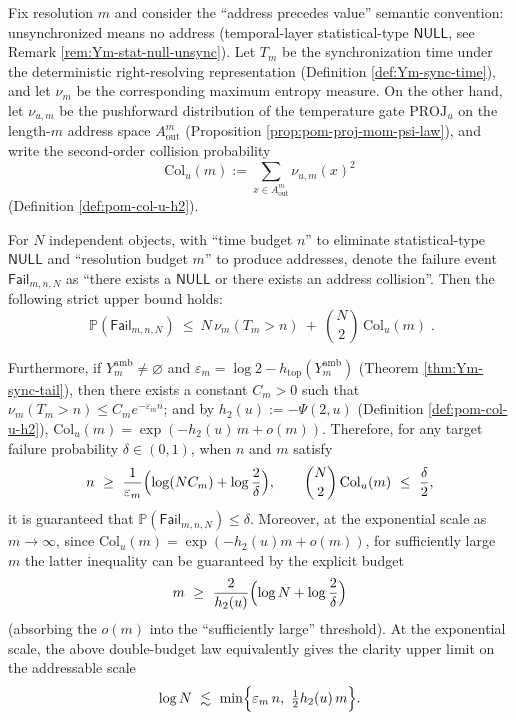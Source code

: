 \begin{theorem}\label{thm:spg-double-budget-address-capacity}
Fix resolution \(m\) and consider the ``address precedes value'' semantic convention: unsynchronized means no address (temporal-layer statistical-type \(\mathsf{NULL}\), see Remark \ref{rem:Ym-stat-null-unsync}).
Let \(T_m\) be the synchronization time under the deterministic right-resolving representation (Definition \ref{def:Ym-sync-time}), and let \(\nu_m\) be the corresponding maximum entropy measure.
On the other hand, let \(\nu_{u,m}\) be the pushforward distribution of the temperature gate \(\mathrm{PROJ}_u\) on the length-\(m\) address space \(A_{\mathrm{out}}^m\) (Proposition \ref{prop:pom-proj-mom-psi-law}), and write the second-order collision probability
\[
\mathrm{Col}_u(m):=\sum_{x\in A_{\mathrm{out}}^m}\nu_{u,m}(x)^2
\]
(Definition \ref{def:pom-col-u-h2}).
\par
For \(N\) independent objects, with ``time budget \(n\)'' to eliminate statistical-type \(\mathsf{NULL}\) and ``resolution budget \(m\)'' to produce addresses, denote the failure event \(\mathsf{Fail}_{m,n,N}\) as ``there exists a \(\mathsf{NULL}\) or there exists an address collision''.
Then the following strict upper bound holds:
\begin{equation}\label{eq:spg-double-budget-fail-bound}
\boxed{\;
\mathbb{P}(\mathsf{Fail}_{m,n,N})
\ \le\
N\,\nu_m(T_m>n)\ +\ \binom{N}{2}\,\mathrm{Col}_u(m)\; }.
\end{equation}
\par
Furthermore, if \(Y_m^{\mathrm{amb}}\neq\varnothing\) and \(\varepsilon_m=\log 2-h_{\mathrm{top}}(Y_m^{\mathrm{amb}})\) (Theorem \ref{thm:Ym-sync-tail}), then there exists a constant \(C_m>0\) such that \(\nu_m(T_m>n)\le C_m e^{-\varepsilon_m n}\);
and by \(h_2(u):=-\Psi(2,u)\) (Definition \ref{def:pom-col-u-h2}),
\(
\mathrm{Col}_u(m)=\exp(-h_2(u)\,m+o(m))
\).
Therefore, for any target failure probability \(\delta\in(0,1)\), when \(n\) and \(m\) satisfy
\[
n\ \ge\ \frac{1}{\varepsilon_m}\Bigl(\log(NC_m)+\log\frac{2}{\delta}\Bigr),
\qquad
\binom{N}{2}\,\mathrm{Col}_u(m)\ \le\ \frac{\delta}{2},
\]
it is guaranteed that \(\mathbb{P}(\mathsf{Fail}_{m,n,N})\le\delta\).
Moreover, at the exponential scale as \(m\to\infty\), since \(\mathrm{Col}_u(m)=\exp(-h_2(u)m+o(m))\), for sufficiently large \(m\) the latter inequality can be guaranteed by the explicit budget
\[
m\ \ge\ \frac{2}{h_2(u)}\Bigl(\log N+\log\frac{2}{\delta}\Bigr)
\]
(absorbing the \(o(m)\) into the ``sufficiently large'' threshold).
At the exponential scale, the above double-budget law equivalently gives the clarity upper limit on the addressable scale
\[
\log N\ \lesssim\ \min\Bigl\{\varepsilon_m\,n,\ \tfrac12 h_2(u)\,m\Bigr\}.
\]
\end{theorem}

